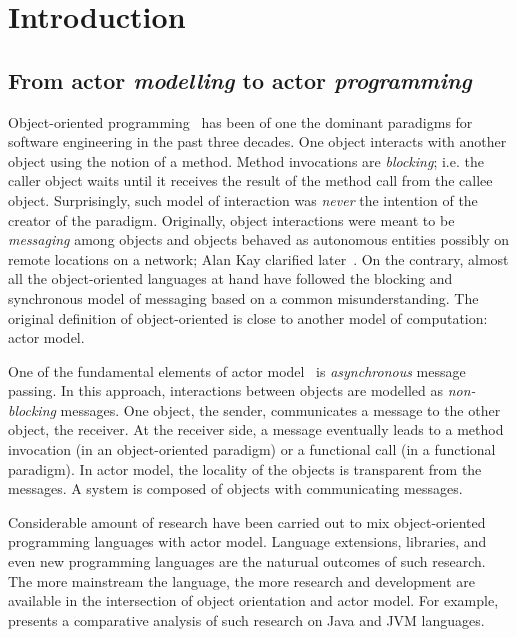 
\chapter[Introduction]{Introduction}
\label{ch:intro}

\section{From actor \emph{modelling} to actor \emph{programming}}
\label{sec:intro:abs}

Object-oriented programming~\cite{booch1982object,meyer1988object} has been of one the dominant paradigms for software engineering in the past three decades.
One object interacts with another object using the notion of a method.
Method invocations are \emph{blocking}; i.e. the caller object waits until it receives the result of the method call from the callee object.
Surprisingly, such model of interaction was \emph{never} the intention of the creator of the paradigm.
Originally, object interactions were meant to be \emph{messaging} among objects and objects behaved as autonomous entities possibly on remote locations on a network; Alan Kay clarified later~\cite{alank1,alank2}. 
On the contrary, almost all the object-oriented languages at hand have followed the blocking and synchronous model of messaging based on a common misunderstanding. 
The original definition of object-oriented is close to another model of computation: actor model.  

One of the fundamental elements of actor model~\cite{actors:agha,agha97} is \emph{asynchronous} message passing.
In this approach, interactions between objects are modelled as \emph{non-blocking} messages.
One object, the sender, communicates a message to the other object, the receiver.
At the receiver side, a message eventually leads to a method invocation (in an object-oriented paradigm) or a functional call (in a functional paradigm).
In actor model, the locality of the objects is transparent from the messages.
A system is composed of objects with communicating messages.

Considerable amount of research have been carried out to mix object-oriented programming languages with actor model. 
Language extensions, libraries, and even new programming languages are the naturual outcomes of such research.
The more mainstream the language, the more research and development are available in the intersection of object orientation and actor model.
For example, \cite{actor_frameworks_jvm:agha} presents a comparative analysis of such research on Java and JVM languages.

